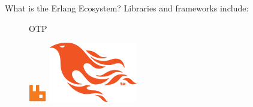 \documentclass[
  ignorenonframetext,
  aspectratio=169]{beamer}
\begin{document}
\begin{frame}{What is the Erlang Ecosystem?}
\label{what-is-the-erlang-ecosystem-1}
Libraries and frameworks include:

\begin{figure}
\centering
\begin{minipage}{.24\textwidth}
  \centering
 \LARGE{OTP}
\end{minipage}
\begin{minipage}{.24\textwidth}
  \centering
  \includegraphics[width=.8\linewidth]{./img/rabbitmq_logo.png}
\end{minipage}
\begin{minipage}{.24\textwidth}
  \centering
  \includegraphics[width=.8\linewidth]{./img/phoenix_logo.png}
\end{minipage}
\begin{minipage}{.24\textwidth}

\end{minipage}
\end{figure}
\end{frame}
\end{document}
